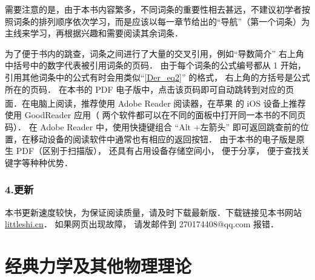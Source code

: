 需要注意的是，由于本书内容繁多，不同词条的重要性相去甚远，不建议初学者按照词条的排列顺序依次学习，而是应该以每一章节给出的“导航”（第一个词条）为主线来学习，再根据兴趣和需要阅读其余词条．

为了便于书内的跳查，词条之间进行了大量的交叉引用，例如“导数简介” 右上角中括号中的数字代表被引用词条的页码． 由于每个词条的公式编号都从 1 开始， 引用其他词条中的公式有时会用类似“\autoref{Der_eq2}” 的格式， 右上角的方括号是公式所在的页码． 在本书的 PDF 电子版中，点击该页码即可自动跳转到对应的页面．在电脑上阅读，推荐使用 Adobe Reader 阅读器，在苹果\textsuperscript{\textregistered} 的 iOS 设备上推荐使用 GoodReader 应用（ 两个软件都可以在不同的面板中打开同一本书的不同页码）． 在 Adobe Reader 中，使用快捷键组合 “Alt +左箭头” 即可返回跳查前的位置，在移动设备的阅读软件中通常也有相应的返回按钮． 由于本书的电子版是原生 PDF（区别于扫描版）， 还具有占用设备存储空间小， 便于分享， 便于查找关键字等种种优势．

\subsection{4.更新}
本书更新速度较快，为保证阅读质量，请及时下载最新版．下载链接见本书网站 \href{http://littleshi.cn}{\color{blue}littleshi.cn}． 如果网页出现故障， 请发邮件到 270174408@qq.com 报错．





\chapter*{经典力学及其他物理理论}


